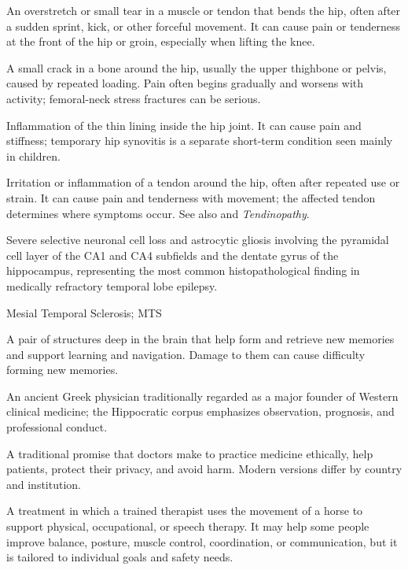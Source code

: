  An overstretch or small tear in a muscle or tendon that bends the hip, often after a sudden sprint, kick, or other forceful movement. It can cause pain or tenderness at the front of the hip or groin, especially when lifting the knee.

 A small crack in a bone around the hip, usually the upper thighbone or pelvis, caused by repeated loading. Pain often begins gradually and worsens with activity; femoral-neck stress fractures can be serious.

 Inflammation of the thin lining inside the hip joint. It can cause pain and stiffness; temporary hip synovitis is a separate short-term condition seen mainly in children.

 Irritation or inflammation of a tendon around the hip, often after repeated use or strain. It can cause pain and tenderness with movement; the affected tendon determines where symptoms occur. See also  and \textit{Tendinopathy}.

 Severe selective neuronal cell loss and astrocytic gliosis involving the pyramidal cell layer of the CA1 and CA4 subfields and the dentate gyrus of the hippocampus, representing the most common histopathological finding in medically refractory temporal lobe epilepsy.

\synonyms
Mesial Temporal Sclerosis; MTS

 A pair of structures deep in the brain that help form and retrieve new memories and support learning and navigation. Damage to them can cause difficulty forming new memories.

 An ancient Greek physician traditionally regarded as a major founder of Western clinical medicine; the Hippocratic corpus emphasizes observation, prognosis, and professional conduct.

 A traditional promise that doctors make to practice medicine ethically, help patients, protect their privacy, and avoid harm. Modern versions differ by country and institution.

 A treatment in which a trained therapist uses the movement of a horse to support physical, occupational, or speech therapy. It may help some people improve balance, posture, muscle control, coordination, or communication, but it is tailored to individual goals and safety needs.

